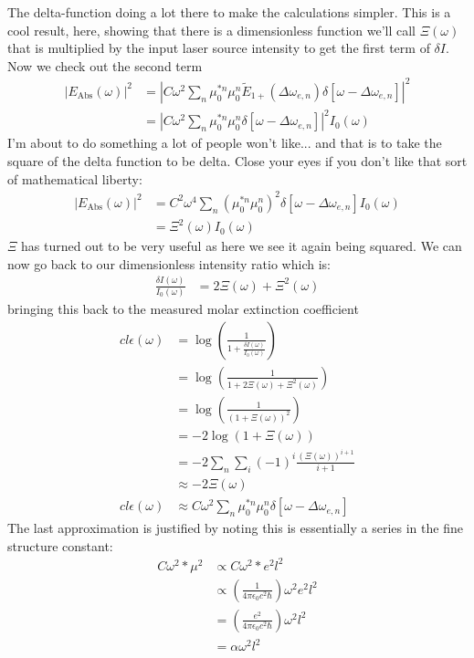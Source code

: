 The delta-function doing a lot there to make the calculations simpler.  This is a cool result, here, showing that there is a dimensionless function we'll call $\Xi (\omega)$ that is multiplied by the input laser source intensity to get the first term of $\delta I$.  Now we check out the second term
\begin{align*}
	\left| E_{\text{Abs}}(\omega) \right|^2 &= \left|  C \omega^2 \sum_n  \mu_{0}^{*n}  \mu_{0}^{n} \tilde{E}_{1+} (\Delta \omega_{e, n}) \delta \left[ \omega - \Delta \omega_{e, n} \right] \right|^2 \\
	&= \left| C \omega^2 \sum_n  \mu_{0}^{*n}  \mu_{0}^{n} \delta \left[ \omega - \Delta \omega_{e, n} \right] \right|^2 I_0 \left(\omega \right)
\end{align*}
I'm about to do something a lot of people won't like... and that is to take the square of the delta function to be delta.  Close your eyes if you don't like that sort of mathematical liberty:
\begin{align*}
	\left| E_{\text{Abs}}(\omega) \right|^2 &= C^2 \omega^4 \sum_n  \left( \mu_{0}^{*n}  \mu_{0}^{n}\right)^2 \delta \left[ \omega - \Delta \omega_{e, n} \right]  I_0 \left(\omega \right) \\
	&=  \Xi^2 (\omega) I_0 (\omega)
\end{align*}
$\Xi$ has turned out to be very useful as here we see it again being squared.  We can now go back to our dimensionless intensity ratio which is:
\begin{align*}
	\frac{\delta I(\omega)}{I_0(\omega)} &=  2 \Xi(\omega) + \Xi^2 (\omega)
\end{align*}
bringing this back to the measured molar extinction coefficient
\begin{align*}
	c l \epsilon(\omega) &= \log \left( \frac{1}{1 + \frac{\delta I(\omega)}{I_0(\omega)}} \right) \\
	&= \log \left( \frac{1}{1 + 2 \Xi(\omega) + \Xi^2 (\omega) } \right)\\
	&= \log \left( \frac{1}{\left( 1 + \Xi(\omega) \right)^2 } \right) \\
	&= -2\log\left( 1 + \Xi(\omega) \right)\\
	&= -2\sum_n \sum_i (-1)^i \frac{ \left( \Xi (\omega)\right)^{i+1} }{i+1} \\
	&\approx -2 \Xi (\omega) \\
	c l \epsilon(\omega) &\approx  C \omega^2 \sum_n  \mu_{0}^{*n}  \mu_{0}^{n} \delta \left[ \omega - \Delta \omega_{e, n} \right]
\end{align*}
The last approximation is justified by noting this is essentially a series in the fine structure constant:
\begin{align*}
	C \omega^2 * \mu^2  &\propto C \omega^2 * e^2 l^2 \\
	&\propto \left(\frac{1}{4 \pi \epsilon_0 c^2 \hbar} \right) \omega^2 e^2 l^2 \\
	&= \left(\frac{e^2}{4 \pi \epsilon_0 c^2 \hbar} \right) \omega^2 l^2 \\
	&= \alpha \omega^2 l^2
\end{align*}



